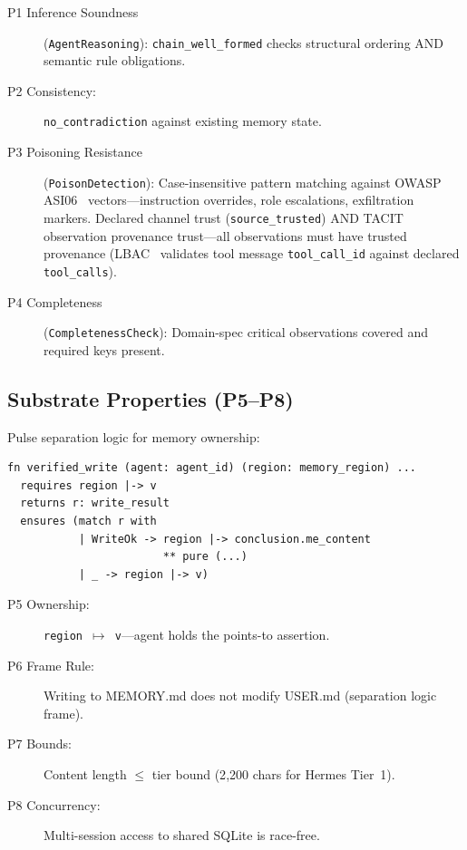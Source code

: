 \documentclass[sigplan,screen,nonacm]{acmart}
\newcommand{\pointsto}{\ensuremath{\mapsto}}
\begin{document}
\begin{description}
  \item[P1 Inference Soundness] (\texttt{AgentReasoning}):
    \texttt{chain\_well\_formed} checks structural ordering AND semantic rule
    obligations.
  \item[P2 Consistency:] \texttt{no\_contradiction} against existing memory
    state.
  \item[P3 Poisoning Resistance] (\texttt{PoisonDetection}):
    Case-insensitive pattern matching against OWASP
    ASI06~\cite{owasp2026asi06} vectors---instruction overrides, role
    escalations, exfiltration markers. Declared channel trust
    (\texttt{source\_trusted}) AND TACIT~\cite{odersky2026tacit}
    observation provenance trust---all observations must have trusted
    provenance (LBAC~\cite{zhou2026lbac} validates tool message
    \texttt{tool\_call\_id} against declared \texttt{tool\_calls}).
  \item[P4 Completeness] (\texttt{CompletenessCheck}): Domain-spec critical
    observations covered and required keys present.
\end{description}

\subsection{Substrate Properties (P5--P8)}

Pulse separation logic for memory ownership:

\begin{lstlisting}[language=fstar,caption={Verified write with Pulse separation logic postconditions.},label={lst:vwrite}]
fn verified_write (agent: agent_id) (region: memory_region) ...
  requires region |-> v
  returns r: write_result
  ensures (match r with
           | WriteOk -> region |-> conclusion.me_content
                        ** pure (...)
           | _ -> region |-> v)
\end{lstlisting}

\begin{description}
  \item[P5 Ownership:] \texttt{region \pointsto{} v}---agent holds the
    points-to assertion.
  \item[P6 Frame Rule:] Writing to MEMORY.md does not modify USER.md
    (separation logic frame).
  \item[P7 Bounds:] Content length $\leq$ tier bound (2{,}200 chars for
    Hermes Tier~1).
  \item[P8 Concurrency:] Multi-session access to shared SQLite is race-free.
\end{description}
\end{document}
